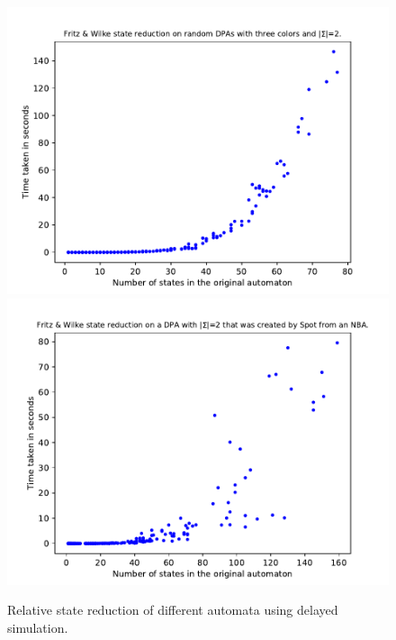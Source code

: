 \begin{figure}
\begin{minipage}{0.49\textwidth}
		\caption{Relative state reduction of different automata using delayed simulation.}
		\label{exp:fig:fritzwilke_size_hist}
	\end{minipage}
	\hfill
	\begin{minipage}{0.49\textwidth}
		\includegraphics[page=2,height=.3\textheight]{../data/analysis/fritzwilke/gendet_ap1.pdf} 
		\includegraphics[page=2,height=.3\textheight]{../data/analysis/fritzwilke/detspot_ap1.pdf} 

\end{minipage}
\end{figure}
